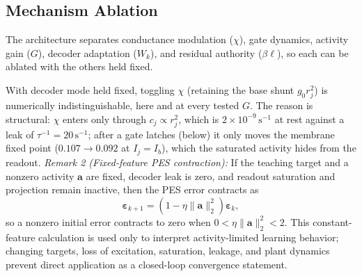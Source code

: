 \documentclass[letterpaper, 10 pt, conference]{ieeeconf}
\begin{document}




\subsection{Mechanism Ablation}
\label{sec:ablation}

The architecture separates conductance modulation ($\chi$), gate dynamics, activity gain ($G$), decoder adaptation ($W_k$), and residual authority ($\beta\bm\ell$), so each can be ablated with the others held fixed.

With decoder mode held fixed, toggling $\chi$ (retaining the base shunt $g_0r_j^2$) is numerically indistinguishable, here and at every tested $G$. The reason is structural: $\chi$ enters only through $c_j\propto r_j^2$, which is $2\times10^{-9}\,\mathrm{s}^{-1}$ at rest against a leak of $\tau^{-1}=20\,\mathrm{s}^{-1}$; after a gate latches (below) it only moves the membrane fixed point ($0.107\to0.092$ at $I_j=I_b$), which the saturated activity hides from the readout.
\textit{Remark 2 (Fixed-feature PES contraction):}\label{rem:pes}
If the teaching target and a nonzero activity $\bm a$ are fixed, decoder leak is zero, and readout saturation and projection remain inactive, then the PES error contracts as
\begin{equation}
 \bm\varepsilon_{k+1}=(1-\eta\|\bm a\|_2^2)\bm\varepsilon_k,
 \label{eq:contraction}
\end{equation}
so a nonzero initial error contracts to zero when $0<\eta\|\bm a\|_2^2<2$. This constant-feature calculation \cite{voelker2015pes} is used only to interpret activity-limited learning behavior; changing targets, loss of excitation, saturation, leakage, and plant dynamics prevent direct application as a closed-loop convergence statement.
\end{document}
